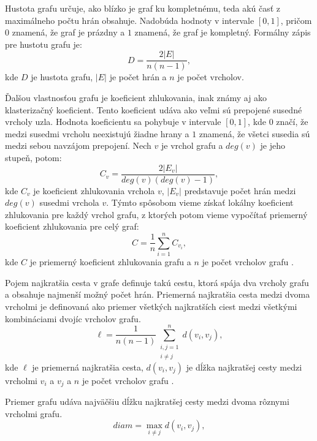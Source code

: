 Hustota grafu určuje, ako blízko je graf ku kompletnému, teda akú časť z maximálneho počtu hrán obsahuje.
Nadobúda hodnoty v intervale $[0, 1]$, pričom $0$ znamená, že graf je prázdny a $1$ znamená, že graf je kompletný.
Formálny zápis pre hustotu grafu je:
\begin{equation}
    D = \frac{2|E|}{n(n-1)},
    \label{eq:hustota}
\end{equation}
kde $D$ je hustota grafu, $|E|$ je počet hrán a $n$ je počet vrcholov.

Ďalšou vlastnosťou grafu je koeficient zhlukovania, inak známy aj ako klasterizačný koeficient.
Tento koeficient udáva ako veľmi sú prepojené susedné vrcholy uzla. Hodnota koeficientu sa pohybuje v intervale $[0, 1]$,
kde $0$ značí, že medzi susedmi vrcholu neexistujú žiadne hrany a $1$ znamená, že všetci susedia sú medzi sebou navzájom prepojení.
Nech $v$ je vrchol grafu a $deg(v)$ je jeho stupeň, potom:
\begin{equation}
    C_v = \frac{2|E_v|}{deg(v)(deg(v)-1)},
    \label{eq:koeficient_zhlukovania_local}
\end{equation}
kde $C_v$ je koeficient zhlukovania vrchola $v$, $|E_v|$ predstavuje počet hrán medzi $deg(v)$ susedmi vrchola $v$. 
Týmto spôsobom vieme získať lokálny koeficient zhlukovania pre každý vrchol grafu, z ktorých potom vieme vypočítať
priemerný koeficient zhlukovania pre celý graf:
\begin{equation}
    C = \frac{1}{n} \sum_{i=1}^{n} C_{v_i},
    \label{eq:koeficient_zhlukovania_global}
\end{equation}
kde $C$ je priemerný koeficient zhlukovania grafu a $n$ je počet vrcholov grafu \cite{barabasi2016network} .

Pojem najkratšia cesta v grafe definuje takú cestu, ktorá spája dva vrcholy grafu a obsahuje najmenší možný počet
hrán. Priemerná najkratšia cesta medzi dvoma vrcholmi je definovaná ako priemer všetkých najkratších ciest medzi
všetkými kombináciami dvojíc vrcholov grafu.	
\begin{equation}
    \ell = \frac{1}{n(n - 1)} \sum_{\substack{i,j = 1 \\ i \ne j}}^{n} d(v_i, v_j),
    \label{eq:avg_shortest_path}
\end{equation}
kde $\ell$ je priemerná najkratšia cesta, $d(v_i, v_j)$ je dĺžka najkratšej cesty medzi vrcholmi $v_i$ a $v_j$ a $n$ je počet vrcholov grafu \cite{barabasi2016network} .

Priemer grafu udáva najväčšiu dĺžku najkratšej cesty medzi dvoma rôznymi vrcholmi grafu.
\begin{equation}
    diam = \max_{i \ne j} d(v_i, v_j),
    \label{eq:diameter}
\end{equation}

